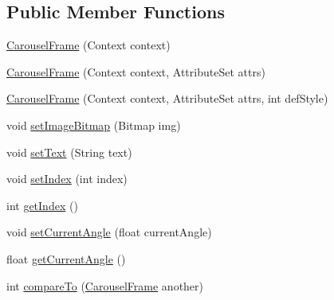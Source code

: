 \subsection*{Public Member Functions}
\begin{DoxyCompactItemize}
\item 
\hyperlink{classcom_1_1zia_1_1freshdocs_1_1widget_1_1fileexplorer_1_1carousel_1_1_carousel_frame_a1eff3b654f56b9e7d370502ba5175fd5}{Carousel\-Frame} (Context context)
\item 
\hyperlink{classcom_1_1zia_1_1freshdocs_1_1widget_1_1fileexplorer_1_1carousel_1_1_carousel_frame_a095e800aaf18c742a033d5ecd8267d20}{Carousel\-Frame} (Context context, Attribute\-Set attrs)
\item 
\hyperlink{classcom_1_1zia_1_1freshdocs_1_1widget_1_1fileexplorer_1_1carousel_1_1_carousel_frame_addc883519e9c0c7924724a9d2500e3f0}{Carousel\-Frame} (Context context, Attribute\-Set attrs, int def\-Style)
\item 
void \hyperlink{classcom_1_1zia_1_1freshdocs_1_1widget_1_1fileexplorer_1_1carousel_1_1_carousel_frame_a8bed89d237ac24d64ec7845556189938}{set\-Image\-Bitmap} (Bitmap img)
\item 
void \hyperlink{classcom_1_1zia_1_1freshdocs_1_1widget_1_1fileexplorer_1_1carousel_1_1_carousel_frame_a00271a35eeaf02f2c3366ae824107eb8}{set\-Text} (String text)
\item 
void \hyperlink{classcom_1_1zia_1_1freshdocs_1_1widget_1_1fileexplorer_1_1carousel_1_1_carousel_frame_af8f5014f23732947b49cc980b633c838}{set\-Index} (int index)
\item 
int \hyperlink{classcom_1_1zia_1_1freshdocs_1_1widget_1_1fileexplorer_1_1carousel_1_1_carousel_frame_a017ab0336032f204f57807ea8b723bf7}{get\-Index} ()
\item 
void \hyperlink{classcom_1_1zia_1_1freshdocs_1_1widget_1_1fileexplorer_1_1carousel_1_1_carousel_frame_af8022c762f4d0cc4ce2ade7a8984aef5}{set\-Current\-Angle} (float current\-Angle)
\item 
float \hyperlink{classcom_1_1zia_1_1freshdocs_1_1widget_1_1fileexplorer_1_1carousel_1_1_carousel_frame_af85071cc2332125c685c7f7961825417}{get\-Current\-Angle} ()
\item 
int \hyperlink{classcom_1_1zia_1_1freshdocs_1_1widget_1_1fileexplorer_1_1carousel_1_1_carousel_frame_a67e1369c8381529a6608d999ccf9dc1e}{compare\-To} (\hyperlink{classcom_1_1zia_1_1freshdocs_1_1widget_1_1fileexplorer_1_1carousel_1_1_carousel_frame}{Carousel\-Frame} another)
\item 

\end{DoxyCompactItemize}

